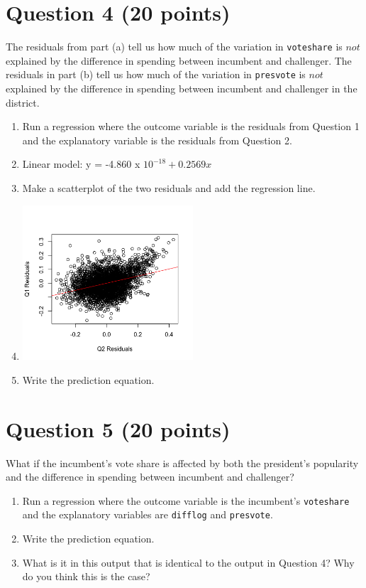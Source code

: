 \documentclass[12pt,letterpaper]{article}
\begin{document}
\section*{Question 4 (20 points)}
\noindent The residuals from part (a) tell us how much of the variation in \texttt{voteshare} is $not$ explained by the difference in spending between incumbent and challenger. The residuals in part (b) tell us how much of the variation in \texttt{presvote} is $not$ explained by the difference in spending between incumbent and challenger in the district.
	\begin{enumerate}
		\item Run a regression where the outcome variable is the residuals from Question 1 and the explanatory variable is the residuals from Question 2.
		\item[] Linear model: y = -4.860 x $10^{-18} + 0.2569x$
		
		\item Make a scatterplot of the two residuals and add the regression line.
		\item[]
		\includegraphics[width=0.5\textwidth]{Q4.png}
		
		\item Write the prediction equation.
	\end{enumerate}
	
	\newpage	

\section*{Question 5 (20 points)}
\noindent What if the incumbent's vote share is affected by both the president's popularity and the difference in spending between incumbent and challenger? 
	\begin{enumerate}
		\item Run a regression where the outcome variable is the incumbent's \texttt{voteshare} and the explanatory variables are \texttt{difflog} and \texttt{presvote}.	\vspace{5cm}
		\item Write the prediction equation.	\vspace{5cm}
		\item What is it in this output that is identical to the output in Question 4? Why do you think this is the case?	\vspace{5cm}
	\end{enumerate}


\end{document}
